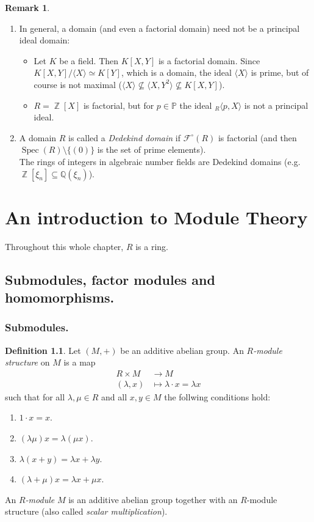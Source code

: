 \documentclass[12pt,a4paper]{report}
\theoremstyle{definition}
\newtheorem{defn}[theorem]{Definition}
\newtheorem*{remark}{Remark}
\theoremstyle{num.custom-title}
\DeclareMathOperator{\Z}{\mathbb{Z}}
\DeclareMathOperator{\sm}{\setminus}
\DeclareMathOperator{\sse}{\subseteq}
\DeclareMathOperator{\Spec}{Spec}
\newcommand{\F}{\mathcal{F}}
\newcommand{\Q}{\mathbb{Q}}
\renewcommand{\P}{\mathbb{P}}
\begin{document}
\begin{remark}\ 
\begin{enumerate}
\item In general, a domain (and even a factorial domain) need not be a principal ideal domain:
\begin{itemize}
\item Let $K$ be a field. Then $K[X,Y]$ is a factorial domain. Since $K[X,Y]/\langle X \rangle \simeq K[Y]$, which is a domain, the ideal $\langle X \rangle$ is prime, but of course is not maximal ($\langle X \rangle \nsubseteq \langle X, Y^2 \rangle \nsubseteq K[X,Y]$).
\item $R=\Z[X]$ is factorial, but for $p \in \P$ the ideal ${}_R\langle p,X \rangle$ is not a principal ideal.
\end{itemize}
\item A domain $R$ is called a \emph{Dedekind domain} if $\F^\circ(R)$ is factorial (and then $\Spec(R) \sm \{(0)\}$ is the set of prime elements).\\
The rings of integers in algebraic number fields are Dedekind domains (e.g. $\Z[\xi_n] \sse \Q(\xi_n)$).
\end{enumerate}
\end{remark}


\chapter{An introduction to Module Theory}

Throughout this whole chapter, $R$ is a ring.

\section{Submodules, factor modules and homomorphisms.}

\subsection{Submodules.}

\begin{defn}
Let $(M,+)$ be an additive abelian group. An \emph{$R$-module structure} on $M$ is a map
\begin{align*}
R \times M &\to M \\
(\lambda,x) &\mapsto \lambda \cdot x = \lambda x
\end{align*}
such that for all $\lambda,\mu \in R$ and all $x,y \in M$ the follwing conditions hold:
\begin{enumerate}
\item $1 \cdot x = x$.
\item $(\lambda \mu) x = \lambda (\mu x)$.
\item $\lambda (x+y) = \lambda x + \lambda y$.
\item $(\lambda + \mu) x = \lambda x + \mu x$.
\end{enumerate}
An \emph{$R$-module} $M$ is an additive abelian group together with an $R$-module structure (also called \emph{scalar multiplication}).
\end{defn}
\end{document}
